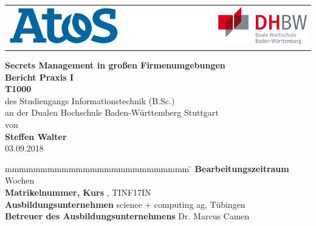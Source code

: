 \documentclass[
a4paper,   
titlepage,  
halfparskip,
12pt        
]{scrartcl}
\begin{document}

\begin{titlepage}
\begin{longtable}{lcr}
{\includegraphics[height=1.7cm]{logo}} &
{\includegraphics[height=1.05cm]{blank}} &
{\includegraphics[height=1.7cm]{dhbw}}
\end{longtable}
\bigskip
\bigskip
\begin{center}
\vspace*{12mm} {\LARGE\bf Secrets Management in großen Firmenumgebungen}\\
\vspace*{12mm} {\large\bf Bericht Praxis I}\\
\vspace*{3mm} {\large\bf T1000}\\
\vspace*{12mm} des Studiengangs Informationstechnik (B.Sc.)\\ an der Dualen Hochschule Baden-Württemberg Stuttgart\\
\vspace*{12mm} von\\
\vspace*{3mm} {\large\bf Steffen Walter}\\
\vspace*{12mm} 03.09.2018\\
\end{center}
\vfill
\begin{spacing}{1.5}
\begin{tabbing}
mmmmmmmmmmmmmmmmmmmmmmmmmm \= \kill
\textbf{Bearbeitungszeitraum}  Wochen\\
\textbf{Matrikelnummer, Kurs} , TINF17IN\\
\textbf{Ausbildungsunternehmen} \> science + computing ag, Tübingen\\
\textbf{Betreuer des Ausbildungsunternehmens} \>Dr. Marcus Camen\\
\end{tabbing}
\end{spacing}
\end{titlepage}
\end{document}

